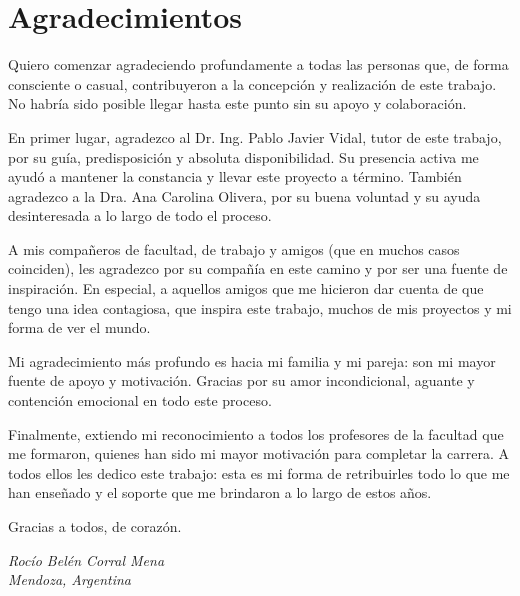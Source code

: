 \chapter*{Agradecimientos}

Quiero comenzar agradeciendo profundamente a todas las personas que, de forma consciente o casual, contribuyeron a la concepción y realización de este trabajo. No habría sido posible llegar hasta este punto sin su apoyo y colaboración.

En primer lugar, agradezco al Dr. Ing. Pablo Javier Vidal, tutor de este trabajo, por su guía, predisposición y absoluta disponibilidad. Su presencia activa me ayudó a mantener la constancia y llevar este proyecto a término. También agradezco a la Dra. Ana Carolina Olivera, por su buena voluntad y su ayuda desinteresada a lo largo de todo el proceso.

A mis compañeros de facultad, de trabajo y amigos (que en muchos casos coinciden), les agradezco por su compañía en este camino y por ser una fuente de inspiración. En especial, a aquellos amigos que me hicieron dar cuenta de que tengo una idea contagiosa, que inspira este trabajo, muchos de mis proyectos y mi forma de ver el mundo.

Mi agradecimiento más profundo es hacia mi familia y mi pareja: son mi mayor fuente de apoyo y motivación. Gracias por su amor incondicional, aguante y contención emocional en todo este proceso.

Finalmente, extiendo mi reconocimiento a todos los profesores de la facultad que me formaron, quienes han sido mi mayor motivación para completar la carrera. A todos ellos les dedico este trabajo: esta es mi forma de retribuirles todo lo que me han enseñado y el soporte que me brindaron a lo largo de estos años.

Gracias a todos, de corazón.

\begin{flushright}
  \textit{Rocío Belén Corral Mena} \\
  \textit{Mendoza, Argentina} \\
  \textit{\DTMMonthname{\month} \number\year}
\end{flushright}

